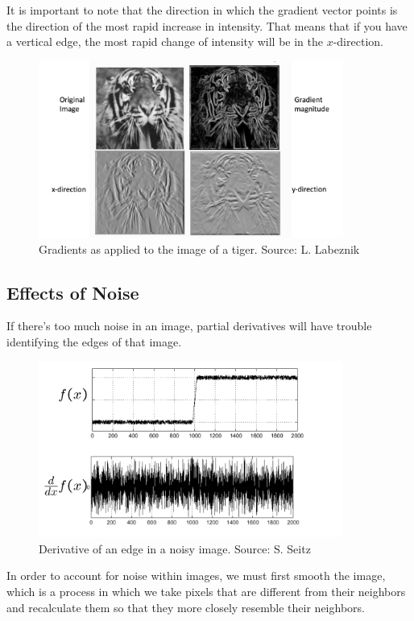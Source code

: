 \documentclass{article}
\begin{document}
It is important to note that the direction in which the gradient vector points is the direction of the most rapid increase in intensity. That means that if you have a vertical edge, the most rapid change of intensity will be in the $x$-direction.

\begin{figure}[H]
\centering
\includegraphics[width=10cm]{lazebnik_tiger.png}
\caption{Gradients as applied to the image of a tiger. Source: L. Labeznik}
\end{figure}


\subsection{Effects of Noise}

If there's too much noise in an image, partial derivatives will have trouble identifying the edges of that image. \newline

\begin{figure}[H]
\centering
\includegraphics[width=10cm]{seitz_noise.png}
\caption{Derivative of an edge in a noisy image. Source: S. Seitz}
\end{figure}

In order to account for noise within images, we must first smooth the image, which is a process in which we take pixels that are different from their neighbors and recalculate them so that they more closely resemble their neighbors. \newline
\end{document}
